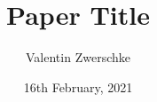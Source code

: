 
\usepackage[margin=0.7in]{geometry}
\usepackage[titletoc,title]{appendix}

\title{Paper Title}
\author{Valentin Zwerschke}
\date{16th February, 2021}



\maketitle


